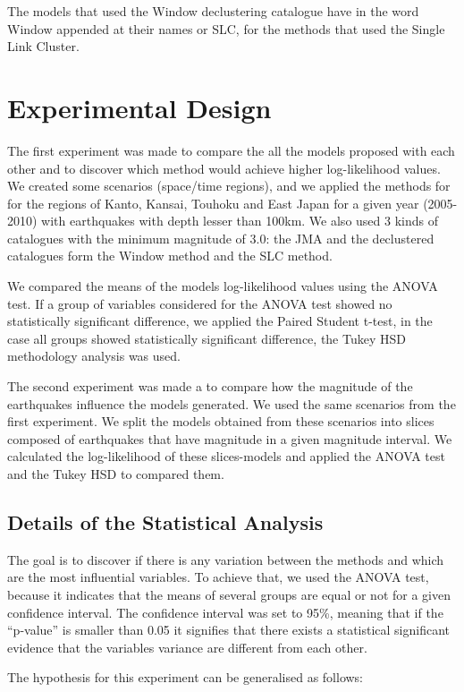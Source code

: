 The models that used the Window declustering catalogue have in the word Window appended at their names or SLC, for the methods that used the Single Link Cluster. 


\section{Experimental Design}
The first experiment was made to compare the all the models proposed with each other and to discover which method would achieve higher log-likelihood values. We created some scenarios (space/time regions), and we applied the methods for for the regions of Kanto, Kansai, Touhoku and East Japan for a given year (2005-2010) with earthquakes with depth lesser than 100km. We also used 3 kinds of catalogues with the minimum magnitude of 3.0: the JMA and the declustered catalogues form the Window method and the SLC method. 

We compared the means of the models log-likelihood values using the ANOVA test. If a group of variables considered for the ANOVA test showed no statistically significant difference, we applied the Paired Student t-test, in the case all groups showed statistically significant difference, the Tukey HSD methodology analysis was used.

The second experiment was made a to compare how the magnitude of the earthquakes influence the models generated. We used the same scenarios from the first experiment. We split the models obtained from these scenarios into slices composed of earthquakes that have magnitude in a given magnitude interval. We calculated the log-likelihood of these slices-models and applied the ANOVA test and the Tukey HSD to compared them.


\subsection{Details of the Statistical Analysis}\label{anova}
The goal is to discover if there is any variation between the methods and which are the most influential variables. To achieve that, we used the ANOVA test, because it indicates that the means of several groups are equal or not for a given confidence interval. The confidence interval was set to 95\%, meaning that if the ``p-value'' is smaller than 0.05 it signifies that there exists a statistical significant evidence that the variables variance are different from each other.

The hypothesis for this experiment can be generalised as follows:

